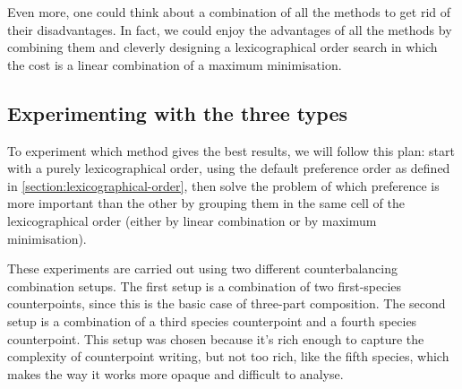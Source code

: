 Even more, one could think about a combination of all the methods to get rid of their disadvantages. In fact, we could enjoy the advantages of all the methods by combining them and cleverly designing a lexicographical order search in which the cost is a linear combination of a maximum minimisation.

\subsection{Experimenting with the three types}
To experiment which method gives the best results, we will follow this plan: start with a purely lexicographical order, using the default preference order as defined in \ref{section:lexicographical-order}, then solve the problem of which preference is more important than the other by grouping them in the same cell of the lexicographical order (either by linear combination or by maximum minimisation).


These experiments are carried out using two different counterbalancing combination setups. The first setup is a combination of two first-species counterpoints, since this is the basic case of three-part composition. The second setup is a combination of a third species counterpoint and a fourth species counterpoint. This setup was chosen because it's rich enough to capture the complexity of counterpoint writing, but not too rich, like the fifth species, which makes the way it works more opaque and difficult to analyse.

